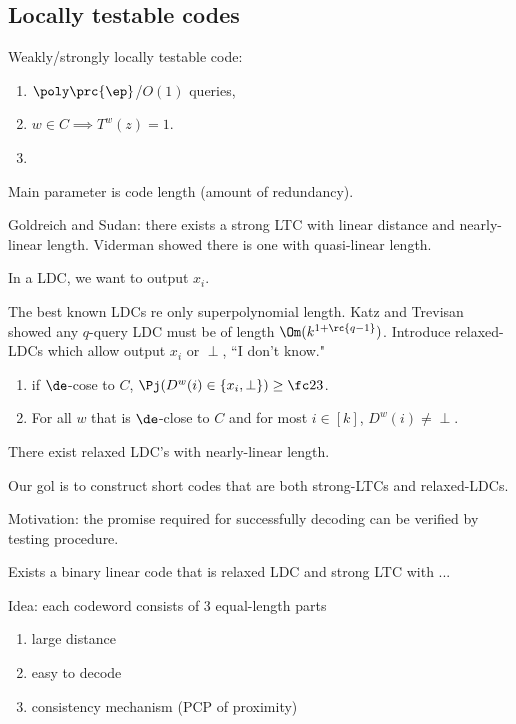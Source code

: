 \subsection{Locally testable codes}

Weakly/strongly locally testable code:
\begin{enumerate}
\item
$\poly\prc{\ep}$/$O(1)$ queries, 
\item
$w\in C\implies T^w(z)=1$.
\item

\end{enumerate}

Main parameter is code length (amount of redundancy).

Goldreich and Sudan: there exists a strong LTC with linear distance and nearly-linear length. 
Viderman showed there is one with quasi-linear length.

In a LDC, we want to output $x_i$.

The best known LDCs re only superpolynomial length. Katz and Trevisan showed any $q$-query LDC must be of length $\Om(k^{1+\rc{q-1}})$. Introduce relaxed-LDCs which allow  output $x_i$ or $\perp$, ``I don't know."
\begin{enumerate}
\item
if $\de$-cose to $C$, $\Pj(D^w(i)\in \{x_i,\perp\})\ge \fc 23$.
\item
For all $w$ that is $\de$-close to $C$ and for most $i\in [k]$, $D^w(i)\ne \perp$.
\end{enumerate}

There exist relaxed LDC's with nearly-linear length.


Our gol is to construct short codes that are both strong-LTCs and relaxed-LDCs.

Motivation: the promise required for successfully decoding can be verified by testing procedure. %

\begin{thm}
Exists a binary linear code that is relaxed LDC and strong LTC with ...
\end{thm}

Idea: each codeword consists of 3 equal-length parts
\begin{enumerate}
\item
large distance
\item
easy to decode
\item
consistency mechanism (PCP of proximity)
\end{enumerate}

